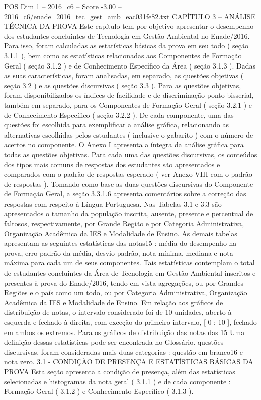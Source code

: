 \begin{textsample}{POS Dim 1 – 2016\_c6 – Score -3.00 – 2016\_c6/enade\_2016\_tec\_gest\_amb\_eac031fe82.txt}  \label{ex:f1_pos_391}
CAPÍTULO 3 – ANÁLISE TÉCNICA DA PROVA Este capítulo tem por objetivo apresentar o desempenho dos estudantes concluintes de Tecnologia em Gestão Ambiental no Enade/2016.
Para isso, foram calculadas as estatísticas básicas da prova em seu todo ( seção 3.1.1 ), bem como as estatísticas relacionadas aos Componentes de Formação Geral ( seção 3.1.2 ) e de Conhecimento Específico da Área ( seção 3.1.3 ).
Dadas as suas características, foram analisadas, em separado, as questões objetivas ( seção 3.2 ) e as questões discursivas ( seção 3.3 ).
Para as questões objetivas, foram disponibilizados os índices de facilidade e de discriminação ponto-bisserial, também em separado, para os Componentes de Formação Geral ( seção 3.2.1 ) e de Conhecimento Específico ( seção 3.2.2 ).
De cada componente, uma das questões foi escolhida para exemplificar a análise gráfica, relacionando as alternativas escolhidas pelos estudantes ( inclusive o gabarito ) com o número de acertos no componente.
O Anexo I apresenta a íntegra da análise gráfica para todas as questões objetivas.
Para cada uma das questões discursivas, os conteúdos dos tipos mais comuns de respostas dos estudantes são apresentados e comparados com o padrão de respostas esperado ( ver Anexo VIII com o padrão de respostas ).
Tomando como base as duas questões discursivas do Componente de Formação Geral, a seção 3.3.1.6 apresenta comentários sobre a correção das respostas com respeito à Língua Portuguesa.
Nas Tabelas 3.1 e 3.3 são apresentados o tamanho da população inscrita, ausente, presente e percentual de faltosos, respectivamente, por Grande Região e por Categoria Administrativa, Organização Acadêmica da IES e Modalidade de Ensino.
As demais tabelas apresentam as seguintes estatísticas das notas15 : média do desempenho na prova, erro padrão da média, desvio padrão, nota mínima, mediana e nota máxima para cada um de seus componentes.
Tais estatísticas contemplam o total de estudantes concluintes da Área de Tecnologia em Gestão Ambiental inscritos e presentes à prova do Enade/2016, tendo em vista agregações, ou por Grandes Regiões e o país como um todo, ou por Categoria Administrativa, Organização Acadêmica da IES e Modalidade de Ensino.
Em relação aos gráficos de distribuição de notas, o intervalo considerado foi de 10 unidades, aberto à esquerda e fechado à direita, com exceção do primeiro intervalo, [ 0 ; 10 ], fechado em ambos os extremos.
Para os gráficos de distribuição das notas das 15 Uma definição dessas estatísticas pode ser encontrada no Glossário. questões discursivas, foram consideradas mais duas categorias : questão em branco16 e nota zero. 3.1 - CONDIÇÃO DE PRESENÇA E ESTATÍSTICAS BÁSICAS DA PROVA Esta seção apresenta a condição de presença, além das estatísticas selecionadas e histogramas da nota geral ( 3.1.1 ) e de cada componente : Formação Geral ( 3.1.2 ) e Conhecimento Específico ( 3.1.3 ).

\end{textsample}
